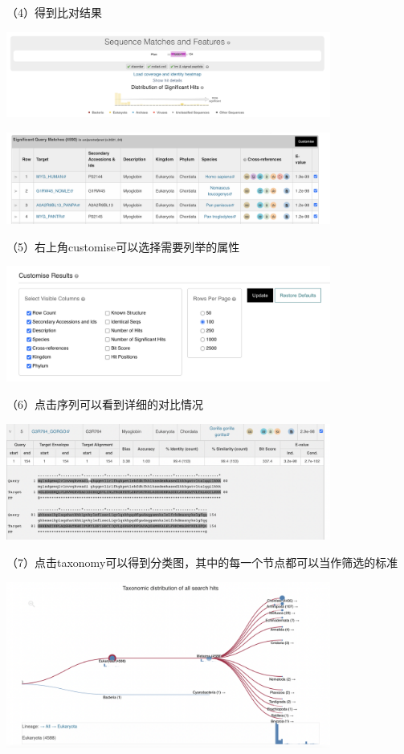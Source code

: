 （4）得到比对结果

\includegraphics[width=0.8\textwidth]{./image/gdk/7.4.4.png}

\includegraphics[width=0.8\textwidth]{./image/gdk/7.4.5.png}


（5）右上角customise可以选择需要列举的属性

\includegraphics[width=0.8\textwidth]{./image/gdk/7.4.6.png}

（6）点击序列可以看到详细的对比情况

\includegraphics[width=0.8\textwidth]{./image/gdk/7.4.7.png}

（7）点击taxonomy可以得到分类图，其中的每一个节点都可以当作筛选的标准

\includegraphics[width=0.8\textwidth]{./image/gdk/7.4.8.png}

